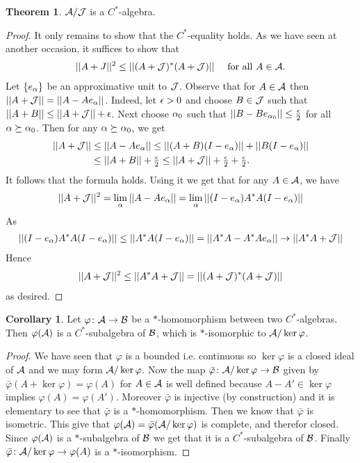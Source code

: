 \documentclass[10pt,english,a4paper]{article}
\theoremstyle{definition}
\newtheorem*{theorem}{Theorem}
\newtheorem*{corollary}{Corollary}
\begin{document}
\begin{theorem}
    $\mathcal{A} /\mathcal{J}$ is a $C^*$-algebra.
\end{theorem}
\begin{proof}
    It only remains to show that the $C^*$-equality holds. As we have seen at
another occasion, it suffices to show that 
\begin{align*}
    ||A+J||^2 \leq ||(A + \mathcal{J})^*(A+ \mathcal{J})||\quad \text{ for all } A \in \mathcal{A}.
\end{align*}
Let $\{e_{\alpha}\}$ be an approximative unit to $\mathcal{J}$. Observe that for 
$A \in \mathcal{A}$ then $||A + \mathcal{J}|| = ||A-Ae_{\alpha}||$. 
Indeed, let $\epsilon > 0$ and choose $B \in \mathcal{J}$ such that 
$||A+B|| \leq ||A+\mathcal{J}|| + \epsilon$. Next choose $\alpha_0$ such that 
$||B-Be_{\alpha_0}|| \leq \tfrac{\epsilon}{2}$ for all $\alpha \succeq \alpha_0$. 
Then for any $\alpha \succeq \alpha_0$, we get
\begin{align*}
    ||A+\mathcal{J}|| &\leq ||A-Ae_{\alpha}|| \leq ||(A+B)(I-e_{\alpha})|| + ||B(I-e_{\alpha})|| \\
&\leq ||A+B|| + \tfrac{\epsilon}{2} \leq ||A+\mathcal{J}|| + \tfrac{\epsilon}{2}+ \tfrac{\epsilon}{2}.
\end{align*}
It follows that the formula holds. Using it we get that for any $A \in \mathcal{A}$,
we have
\begin{align*}
    ||A+\mathcal{J}||^2 &= \lim_{\alpha} ||A-Ae_{\alpha}|| = \lim_{\alpha} ||(I-e_{\alpha})A^*A (I-e_{\alpha})||\\
\end{align*}
As
\begin{align*}
    ||(I-e_{\alpha})A^*A (I-e_{\alpha})|| \leq ||A^*A (I-e_{\alpha})|| = ||A^*A-A^*Ae_{\alpha}|| \to || A^*A + \mathcal{J}|| 
\end{align*}
Hence 
\begin{align*}
||A + \mathcal{J}||^2 \leq ||A^*A + \mathcal{J}|| = ||(A + \mathcal{J})^*(A+\mathcal{J})||
\end{align*}
as desired. 
\end{proof}


\begin{corollary}
    Let $\varphi \colon \mathcal{A} \to \mathcal{B}$ be a $*$-homomorphism between two 
$C^*$-algebras. Then $\varphi(\mathcal{A})$ is a $C^*$-subalgebra of $\mathcal{B}$, which 
is $*$-isomorphic to $\mathcal{A} /\ker \varphi$. 
\end{corollary}
\begin{proof}
    We have seen that $\varphi$ is a bounded i.e. continuous so $\ker\varphi$
is a closed ideal of $\mathcal{A}$ and we may form $\mathcal{A}/\ker\varphi$.
Now the map $\bar{\varphi}\colon \mathcal{A}/\ker\varphi \to \mathcal{B}$ given by
$\bar{\varphi}(A + \ker\varphi) = \varphi(A)$ for $A \in \mathcal{A}$ is 
well defined because $A-A' \in \ker\varphi$ implies 
$\varphi(A) = \varphi(A')$.
Moreover $\bar{\varphi}$ is injective (by construction) and 
it is elementary to see that $\bar{\varphi}$ is a $*$-homomorphism. 
Then we know that $\bar{\varphi}$ is isometric. This give that 
$\varphi(\mathcal{A}) = \bar{\varphi} (\mathcal{A}/\ker\varphi)$ is complete, 
and therefor closed. Since $\varphi(\mathcal{A})$ is a $*$-subalgebra of $\mathcal{B}$ we
get that it is a $C^*$-subalgebra of $\mathcal{B}$. 
Finally $\bar{\varphi}\colon \mathcal{A}/\ker\varphi \to \varphi (A)$
is a $*$-isomorphism.
\end{proof}
\end{document}
